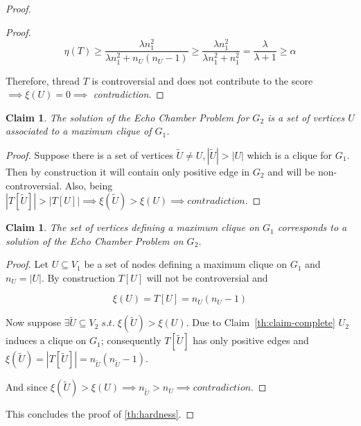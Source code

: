 \documentclass{article}
\newtheorem{claim}[theorem]{Claim}
\begin{document}
\begin{proof}
\begin{proof}
		\begin{equation}
			\eta(T) \geq \frac{\lambda n_{1} ^{2} }{\lambda n_{1} ^{2} + n_U (n_U -1) }
			\geq \frac{\lambda n_{1} ^{2} }{\lambda n_{1} ^{2} + n_{1} ^{2}  }
			= \frac{\lambda }{\lambda + 1} \geq \alpha
		\end{equation}

		Therefore, thread $T$ is controversial and does not
		contribute to the score $\implies \xi(U) = 0 \implies$ \emph{contradiction}.
	\end{proof}

	\begin{claim}
		\label{th:max-clique}
		The solution of the Echo Chamber Problem for $G_2$ is a set of vertices
		$U$ associated to a \emph{maximum clique} of $G_1$.
	\end{claim}

	\begin{proof}
		Suppose there is a set of vertices $\tilde{U} \neq U, |\tilde{U}| >
			|U|$ which is a clique for $G_1$. Then by construction it will
		contain only positive edge in $G_2$ and will be
		non-controversial. Also, being $|T[\tilde{U}]| > |T[U]| \implies
			\xi(\tilde{U}) > \xi(U) \implies contradiction$.
	\end{proof}

	\begin{claim}
		The set of vertices defining a maximum clique on $G_1$
		corresponds to a solution of the Echo Chamber Problem on $G_2$.
	\end{claim}

	\begin{proof}
		Let $U \subseteq V_1$ be a set of nodes defining a maximum clique on
		$G_1$ and $n_{U} = |U|$. By construction $T[U]$ will not be controversial and

		\begin{equation}
			\xi(U) = T[U] = n_{U} (n_{U} -1 )
		\end{equation}

		Now suppose $\exists \tilde{U} \subseteq V_2 \; s.t. \; \xi(\tilde{U})
			> \xi(U)$. Due to Claim~\ref{th:claim-complete} $U_2$ induces a
		clique on $G_1$; consequently $T[\tilde{U}]$ has only positive
		edges and $\xi(\tilde{U}) = |T[\tilde{U}]| = n_{\tilde{U}} (n_{\tilde{U}} - 1)$.

		And since $\xi(\tilde{U}) > \xi({U}) \implies n_{\tilde{U}} > n_{U}
			\implies contradiction$.
	\end{proof}

	This concludes the proof of \autoref{th:hardness}.
\end{proof}
\end{document}

